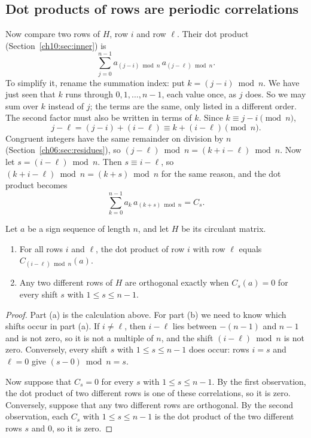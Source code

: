\subsection*{Dot products of rows are periodic correlations}
Now compare two rows of $H$, row $i$ and row $\ell$. Their dot product (Section~\ref{ch10:sec:inner}) is
\[
 \sum_{j=0}^{n-1}a_{(j-i)\bmod n}\,a_{(j-\ell)\bmod n}.
\]
To simplify it, rename the summation index: put $k=(j-i)\bmod n$. We have just seen that $k$ runs through $0,1,\ldots,n-1$, each value once, as $j$ does. So we may sum over $k$ instead of $j$; the terms are the same, only listed in a different order. The second factor must also be written in terms of $k$. Since $k\equiv j-i\pmod n$,
\[
 j-\ell=(j-i)+(i-\ell)\equiv k+(i-\ell)\pmod n.
\]
Congruent integers have the same remainder on division by $n$ (Section~\ref{ch06:sec:residues}), so $(j-\ell)\bmod n=(k+i-\ell)\bmod n$. Now let $s=(i-\ell)\bmod n$. Then $s\equiv i-\ell$, so $(k+i-\ell)\bmod n=(k+s)\bmod n$ for the same reason, and the dot product becomes
\[
 \sum_{k=0}^{n-1}a_k\,a_{(k+s)\bmod n}=C_s.
\]

\par\noindent\begin{minipage}{\linewidth}
\begin{proposition}\label{ch14:prop:rows}
Let $a$ be a sign sequence of length $n$, and let $H$ be its circulant matrix.
\begin{enumerate}
\item[(a)] For all rows $i$ and $\ell$, the dot product of row $i$ with row $\ell$ equals $C_{(i-\ell)\bmod n}(a)$.
\item[(b)] Any two different rows of $H$ are orthogonal exactly when $C_s(a)=0$ for every shift $s$ with $1\le s\le n-1$.
\end{enumerate}
\end{proposition}
\end{minipage}\par

\begin{proof}
Part (a) is the calculation above. For part (b) we need to know which shifts occur in part (a). If $i\ne\ell$, then $i-\ell$ lies between $-(n-1)$ and $n-1$ and is not zero, so it is not a multiple of $n$, and the shift $(i-\ell)\bmod n$ is not zero. Conversely, every shift $s$ with $1\le s\le n-1$ does occur: rows $i=s$ and $\ell=0$ give $(s-0)\bmod n=s$.

Now suppose that $C_s=0$ for every $s$ with $1\le s\le n-1$. By the first observation, the dot product of two different rows is one of these correlations, so it is zero. Conversely, suppose that any two different rows are orthogonal. By the second observation, each $C_s$ with $1\le s\le n-1$ is the dot product of the two different rows $s$ and $0$, so it is zero.
\end{proof}

